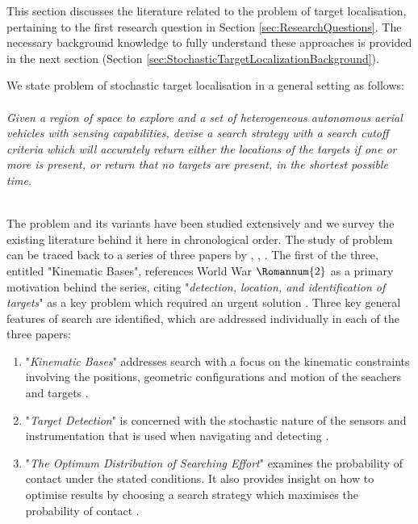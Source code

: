 


This section discusses the literature related to the problem of target localisation, pertaining to the first research question in Section \ref{sec:ResearchQuestions}. The necessary background knowledge to fully understand these approaches is provided in the next section (Section \ref{sec:StochasticTargetLocalizationBackground}).\par


We state problem of stochastic target localisation in a general setting as follows:
\\
\\
   \textit{ Given a region of space to explore and a set of heterogeneous autonomous aerial vehicles with sensing capabilities, devise a search strategy with a search cutoff criteria which will accurately return either the locations of the targets if one or more is present, or return that no targets are present, in the shortest possible time.}
\\
\\
\par The problem and its variants have been studied extensively and we survey the existing literature behind it here in chronological order. The study of problem can be traced back to a series of three papers by \citeauthor{KoopmanTheoryOfSearchTargetDetection} \cite{Koopman1956THEBASES}, \cite{KoopmanTheoryOfSearchTargetDetection}, \cite{Koopman1957TheEffort}. The first of the three, entitled "Kinematic Bases", references World War $\Romannum{2}$ as a primary motivation behind the series, citing "\textit{detection, location, and identification of targets}" as a key problem which required an urgent solution \cite{Koopman1956THEBASES}. Three key general features of search are identified, which are addressed individually in each of the three papers:
\begin{enumerate}
    \item "\textit{Kinematic Bases}" addresses search with a focus on the kinematic constraints involving the positions, geometric configurations and motion of the seachers and targets \cite{Koopman1956THEBASES}.

    \item "\textit{Target Detection}" is concerned with the stochastic nature of the sensors and instrumentation that is used when navigating and detecting \cite{KoopmanTheoryOfSearchTargetDetection}.
 
    \item "\textit{The Optimum Distribution of Searching Effort}" examines the probability of contact under the stated conditions. It also provides insight on how to optimise results by choosing a search strategy which maximises the probability of contact \cite{Koopman1957TheEffort}.
\end{enumerate}
